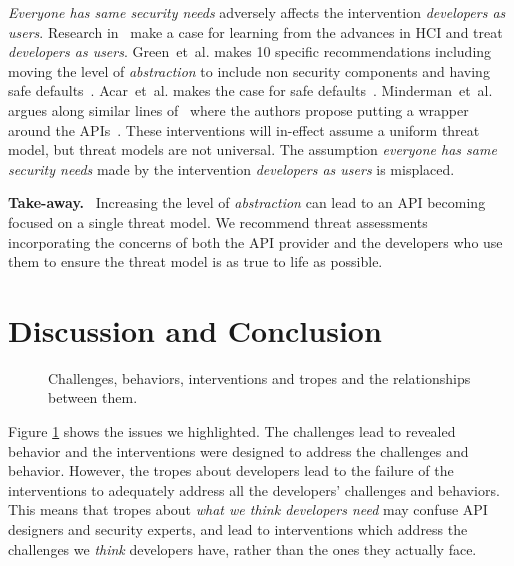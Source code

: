 \documentclass[conference]{IEEEtran}
\newenvironment{finding}{\begin{framed}\noindent\textbf{Take-away.}~}{\end{framed}}
\newcommand{\etal}[0]{et~al{.}}
\begin{document}
\emph{Everyone has same security needs} adversely affects the intervention \emph{developers as users}. Research in~\cite{rashid2019,acar2016} make a case for learning from the advances in \ac{HCI} and treat \emph{developers as users}. Green~\etal{} makes 10 specific recommendations including moving the level of \emph{abstraction} to include non security components and having safe defaults~\cite{smithgreen2016}. Acar~\etal{} makes the case for safe defaults~\cite{acarusability2017}. Minderman~\etal{} argues along similar lines of~\cite{smithgreen2016,acar2016} where the authors propose putting a wrapper around the APIs~\cite{mindermanrust2018}. These interventions will in-effect assume a uniform threat model, but threat models are not universal. The assumption \emph{everyone has same security needs} made by the intervention \emph{developers as users} is misplaced.  
\begin{finding}
\noindent  
Increasing the level of \emph{abstraction} can lead to an API becoming focused on a single  threat model. We recommend threat assessments incorporating the concerns of both the API provider and the developers who use them to ensure the threat model is as true to life as possible.
\end{finding}
%

\section{Discussion and Conclusion}
\begin{figure}
\centering
{}
\caption{Challenges, behaviors, interventions and tropes and the relationships between them.}
  \label{fig:circle}
\end{figure}

Figure \ref{fig:circle} shows the issues we highlighted. The challenges lead to revealed behavior and the interventions were designed to address the challenges and behavior. However, the tropes about developers lead to the failure of the interventions to adequately address all the developers' challenges and behaviors.  This means that tropes about \emph{what we think developers need} may confuse API designers and security experts, and lead to interventions which address the challenges we \emph{think} developers have, rather than the ones they actually face.
\end{document}
